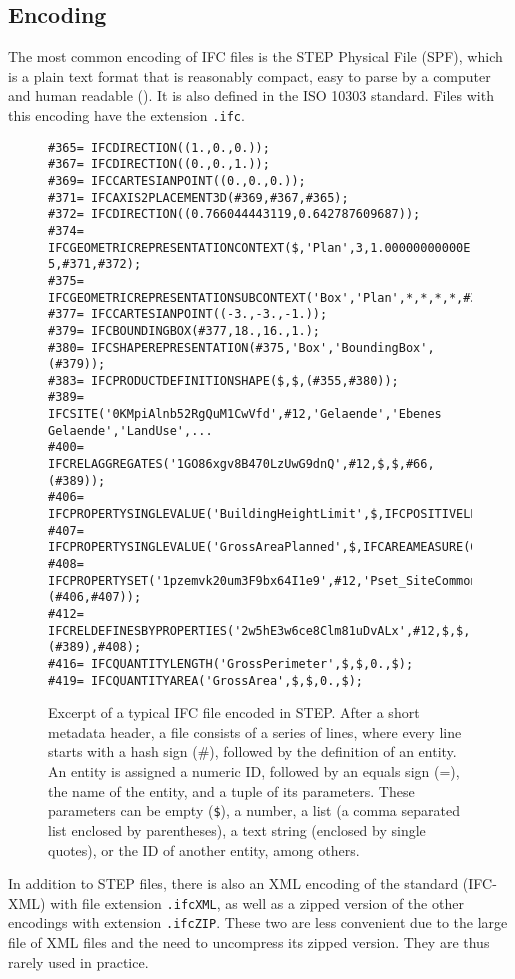 \subsection{Encoding}

The most common encoding of IFC files is the STEP Physical File (SPF), which is a plain text format that is reasonably compact, easy to parse by a computer and human readable ().
It is also defined in the ISO 10303 standard.
Files with this encoding have the extension \texttt{.ifc}.

\lstset{basicstyle=\footnotesize\ttfamily,breaklines=true}
\begin{figure}
\begin{lstlisting}[frame=single]
#365= IFCDIRECTION((1.,0.,0.));
#367= IFCDIRECTION((0.,0.,1.));
#369= IFCCARTESIANPOINT((0.,0.,0.));
#371= IFCAXIS2PLACEMENT3D(#369,#367,#365);
#372= IFCDIRECTION((0.766044443119,0.642787609687));
#374= IFCGEOMETRICREPRESENTATIONCONTEXT($,'Plan',3,1.00000000000E-5,#371,#372);
#375= IFCGEOMETRICREPRESENTATIONSUBCONTEXT('Box','Plan',*,*,*,*,#374,$,.PLAN_VIEW.,$);
#377= IFCCARTESIANPOINT((-3.,-3.,-1.));
#379= IFCBOUNDINGBOX(#377,18.,16.,1.);
#380= IFCSHAPEREPRESENTATION(#375,'Box','BoundingBox',(#379));
#383= IFCPRODUCTDEFINITIONSHAPE($,$,(#355,#380));
#389= IFCSITE('0KMpiAlnb52RgQuM1CwVfd',#12,'Gelaende','Ebenes Gelaende','LandUse',...
#400= IFCRELAGGREGATES('1GO86xgv8B470LzUwG9dnQ',#12,$,$,#66,(#389));
#406= IFCPROPERTYSINGLEVALUE('BuildingHeightLimit',$,IFCPOSITIVELENGTHMEASURE(9.),$);
#407= IFCPROPERTYSINGLEVALUE('GrossAreaPlanned',$,IFCAREAMEASURE(0.),$);
#408= IFCPROPERTYSET('1pzemvk20um3F9bx64I1e9',#12,'Pset_SiteCommon',$,(#406,#407));
#412= IFCRELDEFINESBYPROPERTIES('2w5hE3w6ce8Clm81uDvALx',#12,$,$,(#389),#408);
#416= IFCQUANTITYLENGTH('GrossPerimeter',$,$,0.,$);
#419= IFCQUANTITYAREA('GrossArea',$,$,0.,$);
\end{lstlisting}
\caption{Excerpt of a typical IFC file encoded in STEP\@.
After a short metadata header, a file consists of a series of lines, where every line starts with a hash sign (\#), followed by the definition of an entity.
An entity is assigned a numeric ID, followed by an equals sign (=), the name of the entity, and a tuple of its parameters.
These parameters can be empty (\texttt{\$}), a number, a list (a comma separated list enclosed by parentheses), a text string (enclosed by single quotes), or the ID of another entity, among others.}%
\label{fig:step}
\end{figure}

In addition to STEP files, there is also an XML encoding of the standard (IFC-XML) with file extension \texttt{.ifcXML}, as well as a zipped version of the other encodings with extension \texttt{.ifcZIP}.
These two are less convenient due to the large file of XML files and the need to uncompress its zipped version.
They are thus rarely used in practice.

